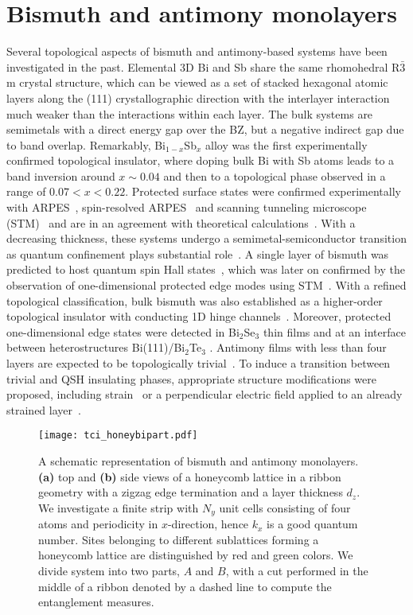\section{Bismuth and antimony monolayers}
\label{sec:bismuth-antimony}
Several topological aspects of bismuth and antimony-based systems have been investigated in the past. Elemental 3D Bi and Sb share the same rhomohedral R$\bar{3}$m crystal structure, which can be viewed as a set of stacked hexagonal atomic layers along the (111) crystallographic direction with the interlayer interaction much weaker than the interactions within each layer. The bulk systems are semimetals with a direct energy gap over the BZ, but a negative indirect gap due to band overlap. Remarkably, Bi$_{1-x}$Sb$_{x}$ alloy was the first experimentally confirmed topological insulator, where doping bulk Bi with Sb atoms leads to a band inversion around $x \sim 0.04$ and then to a topological phase observed in a range of $0.07 < x <  0.22$. Protected surface states were confirmed experimentally with ARPES~\cite{Hsieh2008}, spin-resolved ARPES~\cite{Hsieh919} and scanning tunneling microscope (STM)~\cite{Roushan2009} and are in an agreement with theoretical calculations~\cite{PhysRevB.78.045426, PhysRevB.80.085307}. 
With a decreasing thickness, these systems undergo a semimetal-semiconductor transition as quantum confinement plays substantial role~\cite{stable:bi111}. A single layer of bismuth was predicted to host quantum spin Hall states~\cite{Murakami:BiQSH}, which was later on confirmed by the observation of one-dimensional protected edge modes using STM~\cite{drozdov, kawakami2015one, spatialandenergy}. With a refined topological classification, bulk bismuth was also established as a higher-order topological insulator with conducting 1D hinge channels~\cite{Schindler2018}. Moreover, protected one-dimensional edge states were detected in Bi$_2$Se$_3$ thin films \cite{BiSe2d, Zhang:1} and at an interface between heterostructures Bi(111)/Bi$_2$Te$_3$ \cite{BiTe3inter}. Antimony films with less than four layers are expected to be topologically trivial~\cite{Sb:triv}. To induce a transition between trivial and QSH insulating phases, appropriate structure modifications were proposed, including strain~\cite{jin2015quantum, Sb:nontriv} or a perpendicular electric field applied to an already strained layer~\cite{wang2014topological}. 

\begin{figure}[H]
\centering
\texttt{[image: tci\_honeybipart.pdf]}
\caption[Lattice structure of Bi and Sb monolayers]{A schematic representation of bismuth and antimony monolayers. \textbf{(a)} top and  \textbf{(b)} side views of a honeycomb lattice in a ribbon geometry with a zigzag edge termination and a layer thickness $d_z$. We investigate a finite strip with $N_y$ unit cells consisting of four atoms and periodicity in $x$-direction, hence $k_x$ is a good quantum number. Sites belonging to different sublattices forming a honeycomb lattice are distinguished by red and green colors. We divide system into two parts, $A$ and $B$, with a cut performed in the middle of a ribbon denoted by a dashed line to compute the entanglement measures.}
\label{fig:bisb_latt}
\end{figure}

